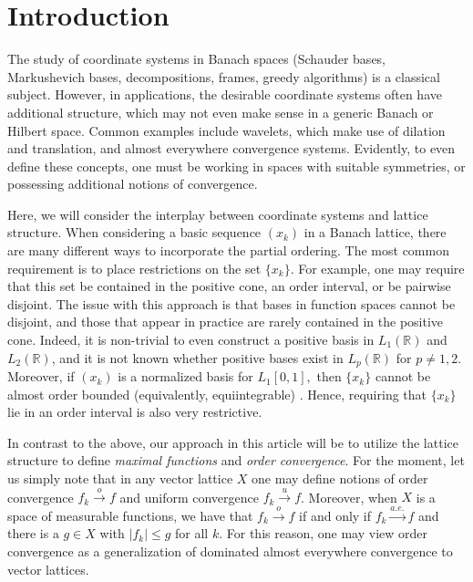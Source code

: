 \documentclass[12pt,leqno]{amsart}
\numberwithin{equation}{section}
\theoremstyle{definition}
\begin{document}
\maketitle
\tableofcontents
\section{Introduction}\label{intro sec}
The study of coordinate systems in Banach spaces (Schauder bases, Markushevich bases, decompositions, frames, greedy algorithms) is a classical subject. However, in applications, the desirable coordinate systems often have additional structure, which may not even make sense in a generic Banach or Hilbert space. Common examples include wavelets, which make use of dilation and translation, and almost everywhere convergence systems.  Evidently, to even define these concepts, one must be working in  spaces  with suitable symmetries, or possessing additional notions of convergence. 
\medskip


Here, we will consider the interplay between coordinate systems and lattice structure. When considering a basic sequence $(x_k)$ in a Banach lattice, there are many different ways to incorporate the partial ordering. The most common requirement is to place restrictions on the set $\{x_k\}$. For example, one may require that this set be contained in the positive cone, an order interval, or be pairwise disjoint. The issue with this approach is that bases in function spaces cannot be disjoint, and those that appear in practice are rarely contained in the positive cone.  
Indeed, it is non-trivial \cite{FPT,JS} to even construct a positive basis in $L_1(\mathbb{R})$ and $L_2(\mathbb{R})$, and it is not known whether positive bases  exist in $L_p(\mathbb{R})$ for $p\neq 1,2.$ Moreover, if $(x_k)$ is a normalized basis for $L_1[0,1],$ then $\{x_k\}$ cannot be almost order bounded (equivalently, equiintegrable) \cite[p.~74-75]{DJT}. Hence, requiring that  $\{x_k\}$ lie in an order interval is also very restrictive.
\medskip

In contrast to the above, our approach in this article will be to  utilize  the lattice structure to define \emph{maximal functions} and \emph{order convergence}. For the moment, let us simply note that in any vector lattice $X$ one may define notions of order convergence $f_k\xrightarrow{o}f$ and uniform convergence $f_k\xrightarrow{u}f$. Moreover, when $X$ is a space of measurable functions, we have that $f_k\xrightarrow{o}f$ if and only if $f_k\xrightarrow{a.e.}f$ and there is a $g\in X$ with $|f_k|\leq g$ for all $k$. For this reason, one may view order convergence as a generalization of dominated almost everywhere convergence to vector lattices. 
\medskip
\end{document}
